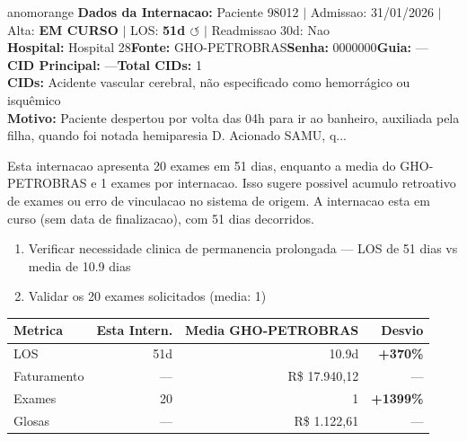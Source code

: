 \documentclass[a4paper,10pt]{article}
\begin{document}
\begin{anomalycard}[Internacao 163980 | GHO-PETROBRAS | ALTO (z=4.55)]{anomorange}
\textbf{Dados da Internacao:} Paciente 98012 $\mid$ Admissao: 31/01/2026 $\mid$ Alta: \textcolor{anomorange}{\textbf{EM CURSO}} $\mid$ LOS: \textbf{51d \textcolor{anomorange}{$\circlearrowleft$}} $\mid$ Readmissao 30d: Nao\\
\textbf{Hospital:} Hospital 28\quad\textbf{Fonte:} GHO-PETROBRAS\quad\textbf{Senha:} 0000000\quad\textbf{Guia:} ---\\
\textbf{CID Principal:} {\small ---}\quad\textbf{Total CIDs:} 1\\

\textbf{CIDs:} {\scriptsize Acidente vascular cerebral, não especificado como hemorrágico ou isquêmico}\\

\textbf{Motivo:} {\scriptsize Paciente despertou por volta das 04h para ir ao banheiro, auxiliada pela filha, quando foi notada hemiparesia D. Acionado SAMU, q...}\\

\vspace{2pt}\begin{tcolorbox}[colback=severityred!20,colframe=anomorange,title={\textbf{Interpretacao de Negocio}},fonttitle=\bfseries\small,left=4pt,right=4pt,top=3pt,bottom=3pt]
{\small Esta internacao apresenta 20 exames em 51 dias, enquanto a media do GHO-PETROBRAS e 1 exames por internacao. Isso sugere possivel acumulo retroativo de exames ou erro de vinculacao no sistema de origem. A internacao esta em curso (sem data de finalizacao), com 51 dias decorridos.}
\end{tcolorbox}
\begin{tcolorbox}[colback=severityyellow!30,colframe=anomorange,title={\textbf{Recomendacoes Especificas}},fonttitle=\bfseries\small,left=4pt,right=4pt,top=3pt,bottom=3pt]
\begin{enumerate}[nosep,leftmargin=16pt]
\item {\small Verificar necessidade clinica de permanencia prolongada --- LOS de 51 dias vs media de 10.9 dias}
\item {\small Validar os 20 exames solicitados (media: 1)}
\end{enumerate}
\end{tcolorbox}
\begin{center}\begin{tabular}{l r r r}\toprule\textbf{Metrica} & \textbf{Esta Intern.} & \textbf{Media GHO-PETROBRAS} & \textbf{Desvio} \\\midrule
LOS & 51d & 10.9d & \textcolor{anomred}{\textbf{+370\%}} \\
Faturamento & --- & R\$ 17.940,12 & --- \\
Exames & 20 & 1 & \textcolor{anomred}{\textbf{+1399\%}} \\
Glosas & --- & R\$ 1.122,61 & --- \\
\bottomrule\end{tabular}\end{center}


\end{anomalycard}
\end{document}
